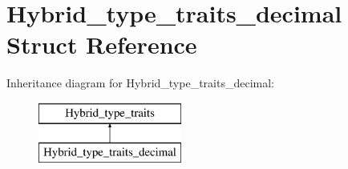 \hypertarget{structHybrid__type__traits__decimal}{}\section{Hybrid\+\_\+type\+\_\+traits\+\_\+decimal Struct Reference}
\label{structHybrid__type__traits__decimal}
Inheritance diagram for Hybrid\+\_\+type\+\_\+traits\+\_\+decimal\+:\begin{figure}[H]
\begin{center}
\leavevmode
\includegraphics[height=2.000000cm]{structHybrid__type__traits__decimal}
\end{center}
\end{figure}
